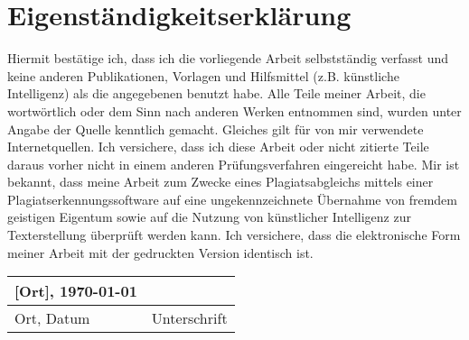 \chapter*{Eigenständigkeitserklärung}
Hiermit bestätige ich, dass ich die vorliegende Arbeit selbstständig verfasst und keine 
anderen Publikationen, Vorlagen und Hilfsmittel (z.B. künstliche Intelligenz) als die 
angegebenen benutzt habe. Alle Teile meiner Arbeit, die wortwörtlich oder dem Sinn nach 
anderen Werken entnommen sind, wurden unter Angabe der Quelle kenntlich gemacht. 
Gleiches gilt für von mir verwendete Internetquellen. Ich versichere, dass ich diese Arbeit 
oder nicht zitierte Teile daraus vorher nicht in einem anderen Prüfungsverfahren eingereicht 
habe. Mir ist bekannt, dass meine Arbeit zum Zwecke eines Plagiatsabgleichs mittels einer 
Plagiatserkennungssoftware auf eine ungekennzeichnete Übernahme von fremdem geistigen 
Eigentum sowie auf die Nutzung von künstlicher Intelligenz zur Texterstellung überprüft 
werden kann. Ich versichere, dass die elektronische Form meiner Arbeit mit der gedruckten 
Version identisch ist.



\vspace{2cm}

\begin{center}
\begin{tabular}{p{}p{}}
    [Ort], \today & \\
    \hline
    Ort, Datum & Unterschrift \\
\end{tabular}
\end{center}